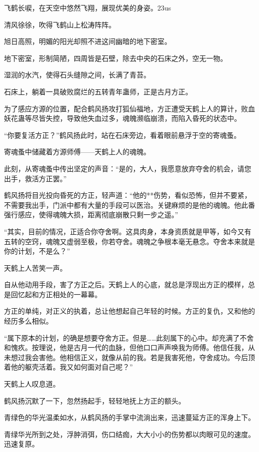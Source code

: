
\begin{this_body}

飞鹤长唳，在天空中悠然飞翔，展现优美的身姿。23us

清风徐徐，吹得飞鹤山上松涛阵阵。

旭日高照，明媚的阳光却照不进这间幽暗的地下密室。

地下密室，形制简陋，四周皆是石壁，除去中央的石床之外，空无一物。

湿润的水汽，使得石头缝隙之间，长满了青苔。

石床上，躺着一具破败腐烂的五转青年蛊师，正是古月方正。

为了感应方源的位置，配合鹤风扬攻打狐仙福地，方正遭受天鹤上人的算计，败血妖花蛊等尽皆失控，导致他失血过多，魂魄濒临崩溃，而陷入昏死的状态中。

“你要复活方正？”鹤风扬此时，站在石床旁边，看着眼前悬浮于空的寄魂蚤。

寄魂蚤中储藏着方源师傅——天鹤上人的魂魄。

此刻，从寄魂蚤中传出坚定的声音：“是的，大人，我愿意放弃夺舍的机会，请您出手，救活方正罢。”

鹤风扬将目光投向昏死的方正，轻声道：“他的**伤势，看似恐怖，但并不要紧，不需要我出手，门派中都有大量的手段可以医治。关键麻烦的是他的魂魄。他此番强行感应，使得魂魄大损，距离彻底崩散只剩一步之遥。”

“其实，目前的情况，正适合你夺舍啊。这具肉身，本身资质就是甲等，如今又有五转的空窍，魂魄又虚弱至极，你若夺舍。魂魄之争根本毫无悬念。夺舍本来就是你的计划，不是么？”

天鹤上人苦笑一声。

自从他动用手段，害了方正之后。天鹤上人的心底，就总是浮现出方正的模样，总是回忆起和方正相处的一幕幕。

方正的单纯，对正义的执着，总让他想起自己年轻的时候。方正的复仇，又和他的经历多么相似。

“属下原本的计划，的确是想要夺舍方正。但是……此刻属下的心中。却充满了不舍和愧疚。按理说，他是古月一代的血脉，但他口口声声唤我为师傅。他信任我，从未想过我会害他。他相信正义，就像从前的我。若是我害死他，夺舍成功。今后顶着他的躯壳活着。我又如何面对自己呢？”

天鹤上人叹息道。

鹤风扬沉默了一下，忽然扬起手，轻轻地抚上方正的额头。

青绿色的华光温柔如水，从鹤风扬的手掌中流淌出来，迅速蔓延方正的浑身上下。

青绿华光所到之处，浮肿消弭，伤口结痂，大大小小的伤势都以肉眼可见的速度。迅速复原。


\end{this_body}
